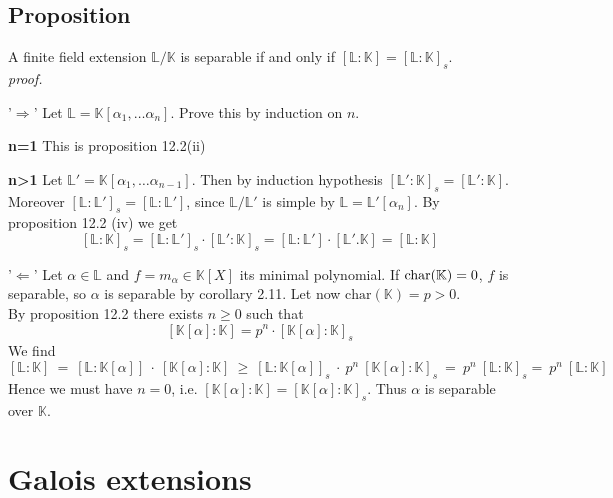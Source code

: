 \documentclass[12pt]{book}
\begin{document}
\begin{spacing}{1.3}
\subsection{Proposition}%
A finite field extension $\mathbb{L}/\mathbb{K}$ is separable if and only if $[\mathbb{L}:\mathbb{K}]=[\mathbb{L}:\mathbb{K}]_s$.
\pagebreak \\
\textit{proof.}
\begin{compactitem}
\item['$\Rightarrow$'] Let $\mathbb{L}=\mathbb{K}[\alpha_1, \dots \alpha_n]$. Prove this by induction on $n$.
\begin{compactitem}
\item[\textbf{n=1}] This is proposition 12.2(ii)
\item[\textbf{n>1}] Let $\mathbb{L}'=\mathbb{K}[\alpha_1, \dots \alpha_{n-1}]$. Then by induction hypothesis $[\mathbb{L}':\mathbb{K}]_s=[\mathbb{L}':\mathbb{K}]$. Moreover $[\mathbb{L}:\mathbb{L}']_s=[\mathbb{L}:\mathbb{L}']$, since $\mathbb{L}/\mathbb{L}'$ is simple by $\mathbb{L}=\mathbb{L}'[\alpha_n]$. By proposition 12.2 (iv) we get
$$[\mathbb{L}:\mathbb{K}]_s=[\mathbb{L}:\mathbb{L}']_s \cdot [\mathbb{L}':\mathbb{K}]_s=[\mathbb{L}:\mathbb{L}'] \cdot [\mathbb{L}'.\mathbb{K}]=[\mathbb{L}:\mathbb{K}]$$
\end{compactitem}
\item['$\Leftarrow$'] Let $\alpha \in \mathbb{L}$ and $f= m_{\alpha} \in \mathbb{K}[X]$ its minimal polynomial. If $\rm{char}(\mathbb{K})=0$, $f$ is separable, so $\alpha$ is separable by corollary 2.11. Let now $\textrm{char}(\mathbb{K})=p>0$. \\
By proposition 12.2 there exists $n \geqslant 0$ such that $$[\mathbb{K}[\alpha]:\mathbb{K}]=p^n \cdot [\mathbb{K}[\alpha]:\mathbb{K}]_s$$We find
$$
[\mathbb{L}:\mathbb{K}]\ =\ [\mathbb{L}:\mathbb{K}[\alpha]] \ \cdot\ [\mathbb{K}[\alpha]:\mathbb{K}] \ \geqslant \ [\mathbb{L}:\mathbb{K}[\alpha]]_s\ \cdot\ p^n \ [\mathbb{K}[\alpha]:\mathbb{K}]_s \ = \ p^n\ [\mathbb{L}:\mathbb{K}]_s = \ p^n  \ [\mathbb{L}:\mathbb{K}]$$
Hence we must have $n=0$, i.e. $[\mathbb{K}[\alpha]:\mathbb{K}]=[\mathbb{K}[\alpha]:\mathbb{K}]_s$. Thus $\alpha$ is separable over $\mathbb{K}$.
\end{compactitem}


\renewcommand*\thesection{§ \arabic{section}\quad}
\section{Galois extensions}
\renewcommand*\thesection{\arabic{section}}


\end{spacing}
\end{document}
